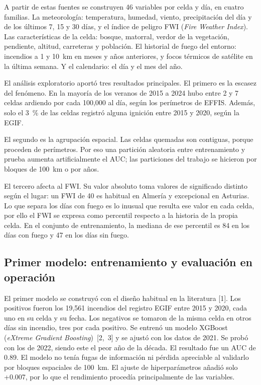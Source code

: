 \documentclass[10pt,a4paper]{article}
\begin{document}
A partir de estas fuentes se construyen 46 variables por celda y día, en
cuatro familias. La meteorología: temperatura, humedad, viento, precipitación
del día y de los últimos 7, 15 y 30 días, y el índice de peligro FWI
(\emph{Fire Weather Index}). Las características de la celda: bosque, matorral,
verdor de la vegetación, pendiente, altitud, carreteras y población. El
historial de fuego del entorno: incendios a 1 y 10~km en meses y años
anteriores, y focos térmicos de satélite en la última semana. Y el calendario:
el día y el mes del año.

El análisis exploratorio aportó tres resultados principales. El primero es la
escasez del fenómeno. En la mayoría de los veranos de 2015 a 2024 hubo entre 2
y 7 celdas ardiendo por cada 100,000 al día, según los perímetros de EFFIS.
Además, solo el 3~\% de las celdas registró alguna ignición entre 2015 y 2020,
según la EGIF.

El segundo es la agrupación espacial. Las celdas quemadas son contiguas, porque
proceden de perímetros. Por eso una partición aleatoria entre entrenamiento y
prueba aumenta artificialmente el AUC; las particiones del trabajo se hicieron
por bloques de 100~km o por años.

El tercero afecta al FWI. Su valor absoluto toma valores de significado
distinto según el lugar: un FWI de 40 es habitual en Almería y excepcional en
Asturias. Lo que separa los días con fuego es lo inusual que resulta ese valor
en cada celda, por ello el FWI se expresa como percentil respecto a la historia
de la propia celda. En el conjunto de entrenamiento, la mediana de ese
percentil es 84 en los días con fuego y 47 en los días sin fuego.

\subsection{Primer modelo: entrenamiento y evaluación en operación}

El primer modelo se construyó con el diseño habitual en la literatura [1]. Los
positivos fueron los 19,561 incendios del registro EGIF entre 2015 y 2020, cada
uno en su celda y su fecha. Los negativos se tomaron de la misma celda en otros
días sin incendio, tres por cada positivo. Se entrenó un modelo XGBoost
(\emph{eXtreme Gradient Boosting})~[2,~3] y se ajustó con los datos de 2021. Se probó
con los de 2022, siendo este el peor año de la década. El resultado fue un AUC
de 0.89. El modelo no tenía fugas de información ni pérdida apreciable al
validarlo por bloques espaciales de 100~km. El ajuste de hiperparámetros añadió
solo +0.007, por lo que el rendimiento procedía principalmente de las
variables.
\end{document}
